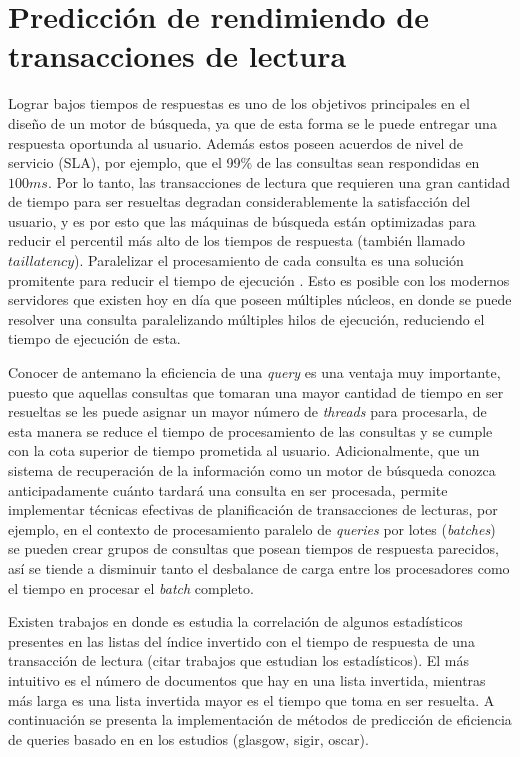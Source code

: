 \chapter{Predicción de rendimiendo de transacciones de lectura}
\label{cap:prediccion}

Lograr bajos tiempos de respuestas es uno de los objetivos principales en el diseño de un motor de búsqueda, ya que de esta forma se le puede entregar una respuesta oportunda al usuario. Además estos poseen acuerdos de nivel de servicio (SLA), por ejemplo, que el 99\% de las consultas sean respondidas en $100 ms$. Por lo tanto, las transacciones de lectura que requieren una gran cantidad de tiempo para ser resueltas degradan considerablemente la satisfacción del usuario, y es por esto que las máquinas de búsqueda están optimizadas para reducir el percentil más alto de los tiempos de respuesta (también llamado $tail latency$). Paralelizar el procesamiento de cada consulta es una solución promitente para reducir el tiempo de ejecución \citep{Jeon:2013, Tatikonda:2011}. Esto es posible con los modernos servidores que existen hoy en día que poseen múltiples núcleos, en donde se puede resolver una consulta paralelizando múltiples hilos de ejecución, reduciendo el tiempo de ejecución de esta.

Conocer de antemano la eficiencia de una \textit{query} es una ventaja muy importante, puesto que aquellas consultas que tomaran una mayor cantidad de tiempo en ser resueltas se les puede asignar un mayor número de \textit{threads} para procesarla, de esta manera se reduce el tiempo de procesamiento de las consultas y se cumple con la cota superior de tiempo prometida al usuario. Adicionalmente, que un sistema de recuperación de la información como un motor de búsqueda conozca anticipadamente cuánto tardará una consulta en ser procesada, permite implementar técnicas efectivas de planificación de transacciones de lecturas, por ejemplo, en el contexto de procesamiento paralelo de \textit{queries} por lotes (\textit{batches}) se pueden crear grupos de consultas que posean tiempos de respuesta parecidos, así se tiende a disminuir tanto el desbalance de carga entre los procesadores como el tiempo en procesar el \textit{batch} completo.

Existen trabajos en donde es estudia la correlación de algunos estadísticos presentes en las listas del índice invertido con el tiempo de respuesta de una transacción de lectura (citar trabajos que estudian los estadísticos). El más intuitivo es el número de documentos que hay en una lista invertida, mientras más larga es una lista invertida mayor es el tiempo que toma en ser resuelta. A continuación se presenta la implementación de métodos de predicción de eficiencia de queries basado en en los estudios (glasgow, sigir, oscar).  

